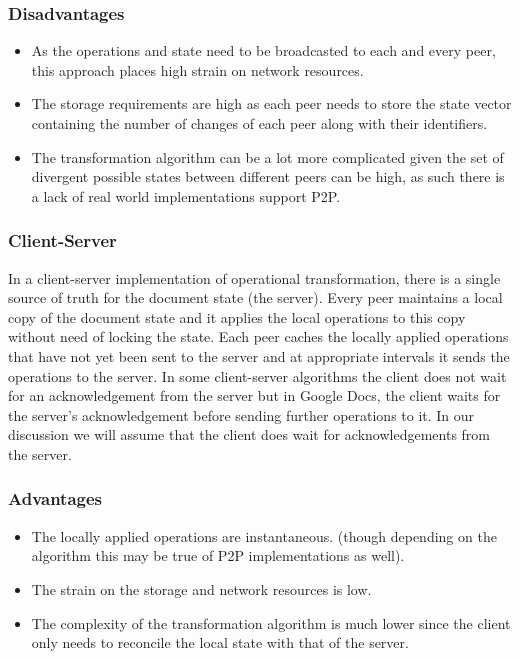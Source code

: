 \documentclass[9pt, titlepage]{article}
\begin{document}
  \subsubsection*{Disadvantages}
  \begin{itemize}
    \item As the operations and state need to be broadcasted to each and every peer, this approach places high strain on network resources.
    \item The storage requirements are high as each peer needs to store the state vector containing the number of changes of each peer along with their identifiers.
    \item The transformation algorithm can be a lot more complicated given the set of divergent possible states between different 
    peers can be high, as such there is a lack of real world implementations support P2P.
  \end{itemize}

  \subsubsection{Client-Server}
  In a client-server implementation of operational transformation, there is a single source of truth for the document state (the server).
  Every peer maintains a local copy of the document state and it applies the local operations to this copy without need of locking the state.
  Each peer caches the locally applied operations that have not yet been sent to the server and at appropriate intervals it sends the operations to the server.
  In some client-server algorithms the client does not wait for an acknowledgement from the server but in Google Docs,
  the client waits for the server's acknowledgement before sending further operations to it.
  In our discussion we will assume that the client does wait for acknowledgements from the server.

  \subsubsection*{Advantages}
  \begin{itemize}
    \item The locally applied operations are instantaneous. (though depending on the algorithm this may be true of P2P implementations as well).
    \item The strain on the storage and network resources is low.
    \item The complexity of the transformation algorithm is much lower since the client only needs to reconcile the local state with that of the server.
  \end{itemize}
\end{document}
